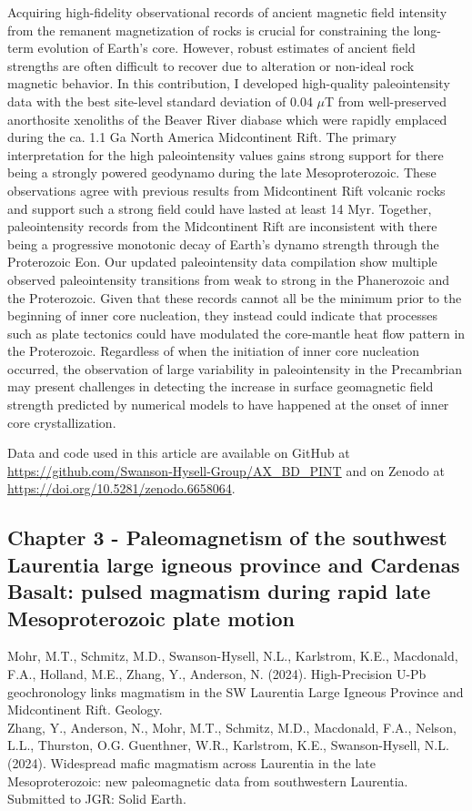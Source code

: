 \documentclass{ucbthesis}
\begin{document}
\begin{frontmatter}
Acquiring high-fidelity observational records of ancient magnetic field intensity from the remanent magnetization of rocks is crucial for constraining the long-term evolution of Earth’s core. However, robust estimates of ancient field strengths are often difficult to recover due to alteration or non-ideal rock magnetic behavior. In this contribution, I developed high-quality paleointensity data with the best site-level standard deviation of 0.04 $\mu$T from well-preserved anorthosite xenoliths of the Beaver River diabase which were rapidly emplaced during the ca. 1.1 Ga North America Midcontinent Rift. The primary interpretation for the high paleointensity values gains strong support for there being a strongly powered geodynamo during the late Mesoproterozoic. These observations agree with previous results from Midcontinent Rift volcanic rocks and support such a strong field could have lasted at least 14 Myr. Together, paleointensity records from the Midcontinent Rift are inconsistent with there being a progressive monotonic decay of Earth’s dynamo strength through the Proterozoic Eon.
Our updated paleointensity data compilation show multiple observed paleointensity transitions from weak to strong in the Phanerozoic and the Proterozoic. Given that these records cannot all be the minimum prior to the beginning of inner core nucleation, they instead could indicate that processes such as plate tectonics could have modulated the core-mantle heat flow pattern in the Proterozoic. Regardless of when the initiation of inner core nucleation occurred, the observation of large variability in paleointensity in the Precambrian may present challenges in detecting the increase in surface geomagnetic field strength predicted by numerical models to have happened at the onset of inner core crystallization.

Data and code used in this article are available on GitHub at \url{https://github.com/Swanson-Hysell-Group/AX_BD_PINT} and on Zenodo at \url{https://doi.org/10.5281/zenodo.6658064}.
 
\clearpage 

\subsection{Chapter 3 - Paleomagnetism of the southwest Laurentia large igneous province and Cardenas Basalt: pulsed magmatism during rapid late Mesoproterozoic plate motion}

Mohr, M.T., Schmitz, M.D., Swanson-Hysell, N.L., Karlstrom, K.E., Macdonald, F.A., Holland, M.E., Zhang, Y., Anderson, N. (2024). High-Precision U-Pb geochronology links magmatism in the SW Laurentia Large Igneous Province and Midcontinent Rift. Geology. 
\\
\noindent Zhang, Y., Anderson, N., Mohr, M.T., Schmitz, M.D., Macdonald, F.A., Nelson, L.L., Thurston, O.G. Guenthner, W.R., Karlstrom, K.E., Swanson-Hysell, N.L. (2024). Widespread mafic magmatism across Laurentia in the late Mesoproterozoic: new paleomagnetic data from southwestern Laurentia. Submitted to JGR: Solid Earth. 
\\


\end{frontmatter}
\end{document}
